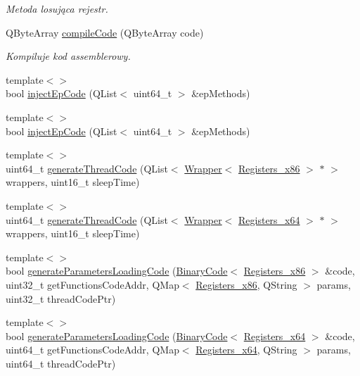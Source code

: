 \begin{DoxyCompactItemize}
\begin{DoxyCompactList}\small\item\em Metoda losująca rejestr. \end{DoxyCompactList}\item 
Q\-Byte\-Array \hyperlink{class_p_e_adding_methods_ad603c09592143cde1df7c87d75a8b7bb}{compile\-Code} (Q\-Byte\-Array code)
\begin{DoxyCompactList}\small\item\em Kompiluje kod assemblerowy. \end{DoxyCompactList}\item 
{\footnotesize template$<$$>$ }\\bool \hyperlink{class_p_e_adding_methods_a22067090f90a0b2fdbe8b127df0113e0}{inject\-Ep\-Code} (Q\-List$<$ uint64\-\_\-t $>$ \&ep\-Methods)
\item 
{\footnotesize template$<$$>$ }\\bool \hyperlink{class_p_e_adding_methods_a22067090f90a0b2fdbe8b127df0113e0}{inject\-Ep\-Code} (Q\-List$<$ uint64\-\_\-t $>$ \&ep\-Methods)
\item 
{\footnotesize template$<$$>$ }\\uint64\-\_\-t \hyperlink{class_p_e_adding_methods_a471203b164d35d021dbfe753cc282223}{generate\-Thread\-Code} (Q\-List$<$ \hyperlink{class_d_adding_methods_1_1_wrapper}{Wrapper}$<$ \hyperlink{codedefines_8h_a0f84efe4ca4d99203713a78bd6e8c82e}{Registers\-\_\-x86} $>$ $\ast$ $>$ wrappers, uint16\-\_\-t sleep\-Time)
\item 
{\footnotesize template$<$$>$ }\\uint64\-\_\-t \hyperlink{class_p_e_adding_methods_ac10d4323c2f2e61cd24db36137b5f5eb}{generate\-Thread\-Code} (Q\-List$<$ \hyperlink{class_d_adding_methods_1_1_wrapper}{Wrapper}$<$ \hyperlink{codedefines_8h_a5e15b5c4d766f6faf29b5bcec37bde5c}{Registers\-\_\-x64} $>$ $\ast$ $>$ wrappers, uint16\-\_\-t sleep\-Time)
\item 
{\footnotesize template$<$$>$ }\\bool \hyperlink{class_p_e_adding_methods_a963cfdaf85b7e1aecc20d4d17c8b2d01}{generate\-Parameters\-Loading\-Code} (\hyperlink{class_binary_code}{Binary\-Code}$<$ \hyperlink{codedefines_8h_a0f84efe4ca4d99203713a78bd6e8c82e}{Registers\-\_\-x86} $>$ \&code, uint32\-\_\-t get\-Functions\-Code\-Addr, Q\-Map$<$ \hyperlink{codedefines_8h_a0f84efe4ca4d99203713a78bd6e8c82e}{Registers\-\_\-x86}, Q\-String $>$ params, uint32\-\_\-t thread\-Code\-Ptr)
\item 
{\footnotesize template$<$$>$ }\\bool \hyperlink{class_p_e_adding_methods_afdab5f7db1574197d673f8674dd8d86e}{generate\-Parameters\-Loading\-Code} (\hyperlink{class_binary_code}{Binary\-Code}$<$ \hyperlink{codedefines_8h_a5e15b5c4d766f6faf29b5bcec37bde5c}{Registers\-\_\-x64} $>$ \&code, uint64\-\_\-t get\-Functions\-Code\-Addr, Q\-Map$<$ \hyperlink{codedefines_8h_a5e15b5c4d766f6faf29b5bcec37bde5c}{Registers\-\_\-x64}, Q\-String $>$ params, uint64\-\_\-t thread\-Code\-Ptr)

\end{DoxyCompactItemize}
